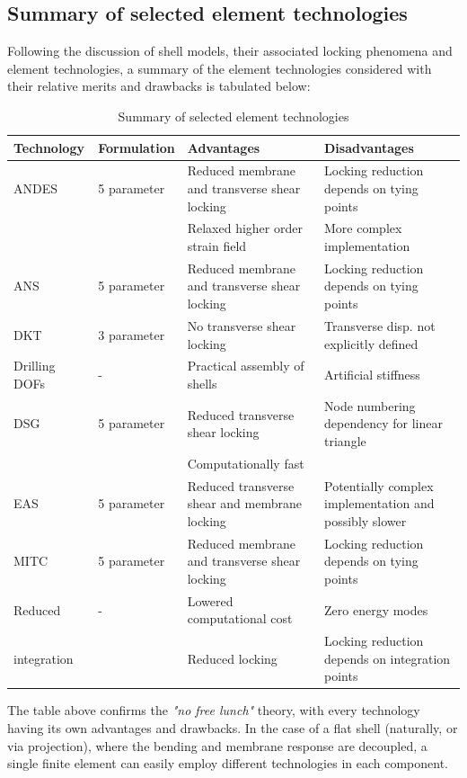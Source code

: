 \subsection{Summary of selected element technologies}

Following the discussion of shell models, their associated locking phenomena and element technologies, a summary of the element technologies considered with their relative merits and drawbacks is tabulated below:

\begin{table}[H]
	\begin{tabularx}{\textwidth}{ | l | l |  X | X | }
		\hline
		\textbf{Technology} 		& 	\textbf{Formulation}	&		\textbf{Advantages}	&		\textbf{Disadvantages}\\
		\hline
		ANDES	& 5 parameter &	Reduced membrane and transverse shear locking &  Locking reduction depends on tying points \\
		\ &\  & Relaxed higher order strain field & More complex implementation \\
		\hline
		ANS & 5 parameter		&  Reduced membrane and transverse shear locking & Locking reduction depends on tying points \\
		\hline
		DKT	&  3 parameter		 & 	No transverse shear locking & Transverse disp. not explicitly defined \\
		\hline
		Drilling DOFs	  &  - & Practical assembly of shells & Artificial stiffness \\
		\hline
		DSG	&	 5 parameter	& Reduced transverse shear locking	& Node numbering dependency for linear triangle \\
		\ &\  & Computationally fast & \  \\
		\hline
		EAS 	  &		  5 parameter		&		Reduced transverse shear and membrane locking & Potentially complex implementation and possibly slower \\
		\hline
		MITC	&		5 parameter	&		Reduced membrane and transverse shear locking & Locking reduction depends on tying points \\
		\hline
		Reduced &		-		&	 Lowered computational cost & Zero energy modes \\
		integration &\  & Reduced locking & Locking reduction depends on integration points \\ 
		\hline
	\end{tabularx}
	\caption{Summary of selected element technologies}
	\label{table:1}
\end{table}

The table above confirms the \textit{"no free lunch"} theory, with every technology having its own advantages and drawbacks. In the case of a flat shell (naturally, or via projection), where the bending and membrane response are decoupled, a single finite element can easily employ different technologies in each component. 

